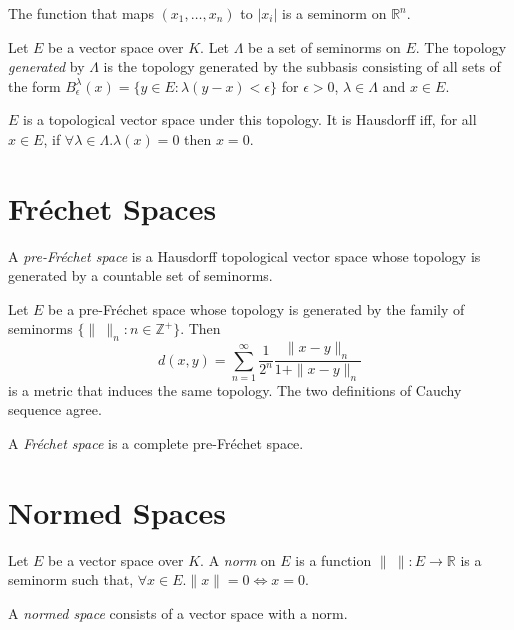 \begin{ex}
The function that maps $(x_1, \ldots, x_n)$ to $|x_i|$ is a seminorm on $\mathbb{R}^n$.
\end{ex}

\begin{df}
Let $E$ be a vector space over $K$.
Let $\Lambda$ be a set of seminorms on $E$. The topology \emph{generated} by $\Lambda$ is the topology generated by the subbasis consisting of all sets of the form $B_\epsilon^\lambda(x) = \{ y \in E : \lambda(y-x) < \epsilon \}$ for $\epsilon > 0$, $\lambda \in \Lambda$ and $x \in E$.
\end{df}

\begin{prop}
$E$ is a topological vector space under this topology. It is Hausdorff iff, for all $x \in E$, if $\forall \lambda \in \Lambda. \lambda(x) = 0$ then $x = 0$.
\end{prop}

\section{Fr\'{e}chet Spaces}

\begin{df}
A \emph{pre-Fr\'{e}chet space} is a Hausdorff topological vector space whose topology is generated by a countable set of seminorms.
\end{df}

\begin{prop}
Let $E$ be a pre-Fr\'{e}chet space whose topology is generated by the family of seminorms $\{ \|\ \|_n : n \in \mathbb{Z}^+ \}$. Then
\[ d(x,y) = \sum_{n=1}^\infty \frac{1}{2^n} \frac{\|x-y\|_n}{1 + \|x-y\|_n} \]
is a metric that induces the same topology. The two definitions of Cauchy sequence agree.
\end{prop}

\begin{df}
A \emph{Fr\'{e}chet space} is a complete pre-Fr\'{e}chet space.
\end{df}

\section{Normed Spaces}

\begin{df}
Let $E$ be a vector space over $K$. A \emph{norm} on $E$ is a function $\|\ \| : E \rightarrow \mathbb{R}$ is a seminorm such that, $\forall x \in E. \| x \| = 0 \Leftrightarrow x = 0$.

A \emph{normed space} consists of a vector space with a norm.
\end{df}

